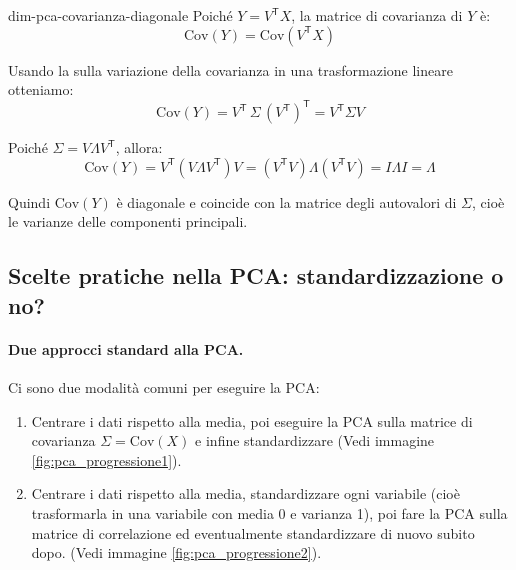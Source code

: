 \begin{dimostrazione}{}{dim-pca-covarianza-diagonale}
Poiché \( Y = V^\mathsf{T} X \), la matrice di covarianza di \( Y \) è:
\[
\mathrm{Cov}(Y) = \mathrm{Cov}(V^\mathsf{T} X)
\]

Usando la  sulla variazione della covarianza in una
trasformazione lineare otteniamo:
\[
    \mathrm{Cov}(Y)
    = V^\mathsf{T} \, \Sigma \, (V^\mathsf{T})^\mathsf{T}
    = V^\mathsf{T} \Sigma V
\]

Poiché \( \Sigma = V \Lambda V^\mathsf{T} \), allora:
\[
\mathrm{Cov}(Y) = V^\mathsf{T} (V \Lambda V^\mathsf{T}) V = (V^\mathsf{T} V)
\Lambda (V^\mathsf{T} V) = I \Lambda I = \Lambda
\]

Quindi \( \mathrm{Cov}(Y) \) è diagonale e coincide con la matrice degli
autovalori di \( \Sigma \), cioè le varianze delle componenti principali.
\end{dimostrazione}

\subsection{Scelte pratiche nella PCA: standardizzazione o no?}

\paragraph{Due approcci standard alla PCA.}
Ci sono due modalità comuni per eseguire la PCA:

\begin{enumerate}
  \item Centrare i dati rispetto alla media, poi eseguire la PCA sulla matrice
  di covarianza \( \Sigma = \mathrm{Cov}(X) \) e infine standardizzare (Vedi
  immagine \ref{fig:pca_progressione1}).
  \item Centrare i dati rispetto alla media, standardizzare ogni variabile
  (cioè trasformarla in una variabile con media 0 e varianza 1), poi fare la
  PCA sulla matrice di correlazione ed eventualmente standardizzare di nuovo
  subito dopo. (Vedi
  immagine \ref{fig:pca_progressione2}).
\end{enumerate}

